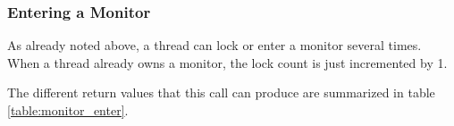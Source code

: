 
\subsubsection{Entering a Monitor}


As already noted above, a thread can lock or enter a monitor several times.
When a thread already owns a monitor, the lock count is just incremented by
1.

The different return values that this call can produce are summarized
in table \ref{table:monitor_enter}.  


